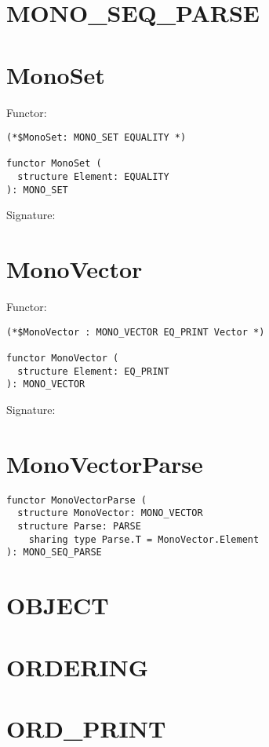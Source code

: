 \newpage
\section{MONO\_SEQ\_PARSE}


\newpage
\section{MonoSet}
Functor:
\begin{verbatim}
(*$MonoSet: MONO_SET EQUALITY *)

functor MonoSet (
  structure Element: EQUALITY
): MONO_SET
\end{verbatim}
\bigskip
Signature:


\newpage
\section{MonoVector}
Functor:
\begin{verbatim}
(*$MonoVector : MONO_VECTOR EQ_PRINT Vector *)

functor MonoVector (
  structure Element: EQ_PRINT
): MONO_VECTOR
\end{verbatim}
\bigskip
Signature:


\newpage
\section{MonoVectorParse}
\begin{verbatim}
functor MonoVectorParse (
  structure MonoVector: MONO_VECTOR
  structure Parse: PARSE
    sharing type Parse.T = MonoVector.Element
): MONO_SEQ_PARSE
\end{verbatim}

\newpage
\section{OBJECT}


\newpage
\section{ORDERING}


\newpage
\section{ORD\_PRINT}


